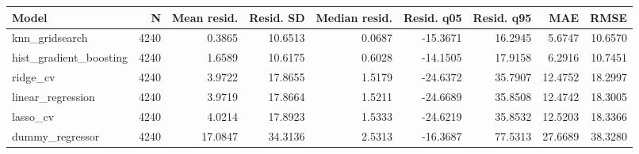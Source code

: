 \begin{tabular}{lrrrrrrrr}
\toprule
Model & N & Mean resid. & Resid. SD & Median resid. & Resid. q05 & Resid. q95 & MAE & RMSE \\
\midrule
knn\_gridsearch & 4240 & 0.3865 & 10.6513 & 0.0687 & -15.3671 & 16.2945 & 5.6747 & 10.6570 \\
hist\_gradient\_boosting & 4240 & 1.6589 & 10.6175 & 0.6028 & -14.1505 & 17.9158 & 6.2916 & 10.7451 \\
ridge\_cv & 4240 & 3.9722 & 17.8655 & 1.5179 & -24.6372 & 35.7907 & 12.4752 & 18.2997 \\
linear\_regression & 4240 & 3.9719 & 17.8664 & 1.5211 & -24.6689 & 35.8508 & 12.4742 & 18.3005 \\
lasso\_cv & 4240 & 4.0214 & 17.8923 & 1.5333 & -24.6219 & 35.8532 & 12.5203 & 18.3366 \\
dummy\_regressor & 4240 & 17.0847 & 34.3136 & 2.5313 & -16.3687 & 77.5313 & 27.6689 & 38.3280 \\
\bottomrule
\end{tabular}
